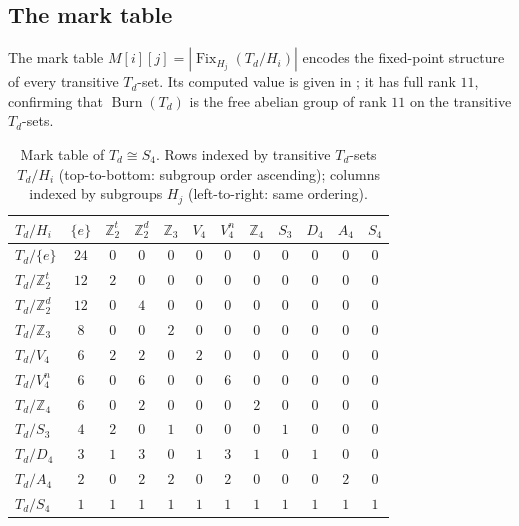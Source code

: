 \documentclass[11pt,a4paper]{article}
\theoremstyle{plain}
\theoremstyle{definition}
\theoremstyle{remark}
\DeclareMathOperator{\Burn}{Burn}
\DeclareMathOperator{\Fix}{Fix}
\newcommand{\Td}{T_{\!d}}
\newcommand{\Z}{\mathbb{Z}}
\begin{document}
\subsection{The mark table}

The mark table $M[i][j] = |\Fix_{H_{j}}(\Td/H_{i})|$ encodes the fixed-point
structure of every transitive $\Td$-set.  Its computed value is given in
; it has full rank $11$, confirming that $\Burn(\Td)$ is
the free abelian group of rank $11$ on the transitive $\Td$-sets.

\begin{table}[H]
\centering\footnotesize
\caption{Mark table of $\Td \cong S_{4}$.  Rows indexed by transitive $\Td$-sets
$\Td/H_{i}$ (top-to-bottom: subgroup order ascending); columns indexed by
subgroups $H_{j}$ (left-to-right: same ordering).}
\label{tab:mark-full}
\renewcommand{\arraystretch}{1.05}
\setlength{\tabcolsep}{3pt}
\begin{tabular}{@{} l | c c c c c c c c c c c @{}}
\toprule
$\Td/H_{i}$ &
$\{e\}$ & $\Z_{2}^{t}$ & $\Z_{2}^{d}$ & $\Z_{3}$ & $V_{4}$ & $V_{4}^{n}$
& $\Z_{4}$ & $S_{3}$ & $D_{4}$ & $A_{4}$ & $S_{4}$ \\
\midrule
$\Td/\{e\}$            & $24$ & $0$ & $0$ & $0$ & $0$ & $0$ & $0$ & $0$ & $0$ & $0$ & $0$ \\
$\Td/\Z_{2}^{t}$       & $12$ & $2$ & $0$ & $0$ & $0$ & $0$ & $0$ & $0$ & $0$ & $0$ & $0$ \\
$\Td/\Z_{2}^{d}$       & $12$ & $0$ & $4$ & $0$ & $0$ & $0$ & $0$ & $0$ & $0$ & $0$ & $0$ \\
$\Td/\Z_{3}$           & $8$  & $0$ & $0$ & $2$ & $0$ & $0$ & $0$ & $0$ & $0$ & $0$ & $0$ \\
$\Td/V_{4}$            & $6$  & $2$ & $2$ & $0$ & $2$ & $0$ & $0$ & $0$ & $0$ & $0$ & $0$ \\
$\Td/V_{4}^{n}$        & $6$  & $0$ & $6$ & $0$ & $0$ & $6$ & $0$ & $0$ & $0$ & $0$ & $0$ \\
$\Td/\Z_{4}$           & $6$  & $0$ & $2$ & $0$ & $0$ & $0$ & $2$ & $0$ & $0$ & $0$ & $0$ \\
$\Td/S_{3}$            & $4$  & $2$ & $0$ & $1$ & $0$ & $0$ & $0$ & $1$ & $0$ & $0$ & $0$ \\
$\Td/D_{4}$            & $3$  & $1$ & $3$ & $0$ & $1$ & $3$ & $1$ & $0$ & $1$ & $0$ & $0$ \\
$\Td/A_{4}$            & $2$  & $0$ & $2$ & $2$ & $0$ & $2$ & $0$ & $0$ & $0$ & $2$ & $0$ \\
$\Td/S_{4}$            & $1$  & $1$ & $1$ & $1$ & $1$ & $1$ & $1$ & $1$ & $1$ & $1$ & $1$ \\
\bottomrule
\end{tabular}
\end{table}
\end{document}
